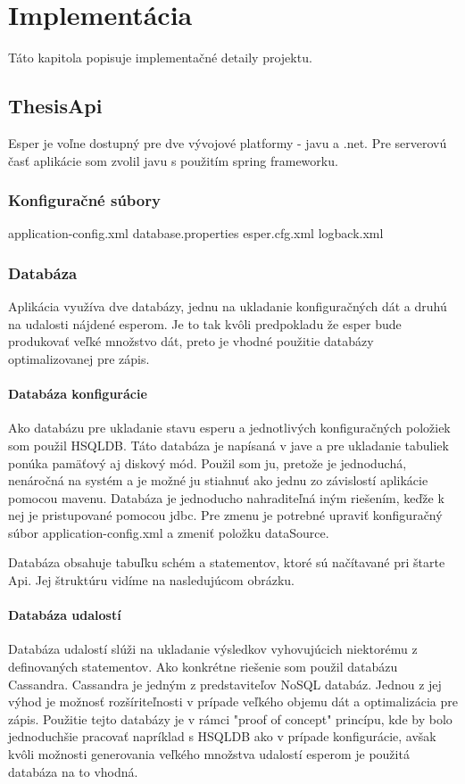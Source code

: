 \chapter{Implementácia}
Táto kapitola popisuje implementačné detaily projektu. 

\section{ThesisApi}
	Esper je voľne dostupný pre dve vývojové platformy - javu a .net. Pre serverovú časť aplikácie som zvolil javu s použitím spring frameworku.
	\subsection{Konfiguračné súbory}
		application-config.xml
		database.properties
		esper.cfg.xml
		logback.xml
	\subsection{Databáza}
		Aplikácia využíva dve databázy, jednu na ukladanie konfiguračných dát a druhú na udalosti nájdené esperom. Je to tak kvôli predpokladu že esper bude produkovať veľké množstvo dát, preto je vhodné použitie databázy optimalizovanej pre zápis.
	
		\subsubsection{Databáza konfigurácie}
		Ako databázu pre ukladanie stavu esperu a jednotlivých konfiguračných položiek som použil \ac{HSQLDB}. Táto databáza je napísaná v jave a pre ukladanie tabuliek ponúka pamäťový aj diskový mód. Použil som ju, pretože je jednoduchá, nenáročná na systém a je možné ju stiahnuť ako jednu zo závislostí aplikácie pomocou mavenu. Databáza je jednoducho nahraditeľná iným riešením, keďže k nej je pristupované pomocou jdbc. Pre zmenu je potrebné upraviť konfiguračný súbor application-config.xml a zmeniť položku dataSource.
		
		Databáza obsahuje tabuľku schém a statementov, ktoré sú načítavané pri štarte Api. Jej štruktúru vidíme na nasledujúcom obrázku.
			
		\subsubsection{Databáza udalostí}
		Databáza udalostí slúži na ukladanie výsledkov vyhovujúcich niektorému z definovaných statementov. Ako konkrétne riešenie som použil databázu Cassandra. Cassandra je jedným z predstaviteľov NoSQL databáz. Jednou z jej výhod je možnosť rozšíriteľnosti v prípade veľkého objemu dát a optimalizácia pre zápis. Použitie tejto databázy je v rámci "proof of concept" princípu, kde by bolo jednoduchšie pracovať napríklad s HSQLDB ako v prípade konfigurácie, avšak kvôli možnosti generovania veľkého množstva udalostí esperom je použitá databáza na to vhodná.
	
